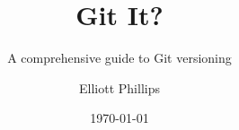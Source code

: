 \title{Git It?}
\subtitle{A comprehensive guide to Git versioning}
\author{Elliott Phillips}
\date{\today}

\frontpage

%
{ %
	\makeatletter
	\@twosidetrue
	\@openrighttrue
	\makeatother
	
	\ifodd\thepage\relax\else\blankpage\fi
	
	
	\setcounter{page}{1}
}









